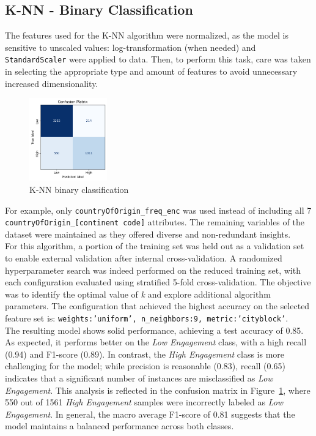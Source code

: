 \subsection{K-NN - Binary Classification}
The features used for the K-NN algorithm were normalized, as the model is sensitive to unscaled values: log-transformation (when needed) and \texttt{StandardScaler} were applied to data. 
Then, to perform this task, care was taken in selecting the appropriate type and amount of features to avoid unnecessary increased dimensionality.
\begin{figure}
    \centering
    \includegraphics[width=0.30\textwidth]{plots/knn_binary_confmatrix.png}
    \caption{K-NN binary classification}
    \label{fig:binary_knn_confusion_matrix}
\end{figure}

For example, only \texttt{countryOfOrigin\_freq\_enc} was used instead of including all 7 \texttt{countryOfOrigin\_[continent code]} attributes. 
The remaining variables of the dataset were maintained as they offered diverse and non-redundant insights.\\
For this algorithm, a portion of the training set was held out as a validation set to enable external validation after internal cross-validation. 
A randomized hyperparameter search was indeed performed on the reduced training set, with each configuration evaluated using stratified 5-fold cross-validation. 
The objective was to identify the optimal value of \textit{k} and explore additional algorithm parameters. 
The configuration that achieved the highest accuracy on the selected feature set is: \texttt{weights:'uniform', n\_neighbors:9, metric:'cityblock'}. \\

The resulting model shows solid performance, achieving a test accuracy of 0.85. As expected, it performs better on the \textit{Low Engagement} class, with a high recall (0.94) and F1-score (0.89). 
In contrast, the \textit{High Engagement} class is more challenging for the model; while precision is reasonable (0.83), recall (0.65) indicates that a significant number of instances are misclassified as 
\textit{Low Engagement}.
This analysis is reflected in the confusion matrix in Figure~\ref{fig:binary_knn_confusion_matrix}, where 550 out of 1561 \textit{High Engagement} samples were incorrectly labeled as \textit{Low Engagement}.
In general, the macro average F1-score of 0.81 suggests that the model maintains a balanced performance across both classes.



